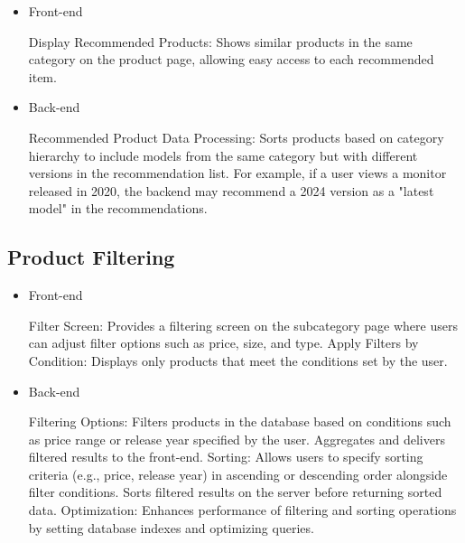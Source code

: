 \documentclass[conference]{IEEEtran}
\begin{document}
\begin{itemize}
\setlength{\parindent}{2ex}
\item Front-end

Display Recommended Products: Shows similar products in the same category on the product page, allowing easy access to each recommended item.

\item Back-end

Recommended Product Data Processing: Sorts products based on category hierarchy to include models from the same category but with different versions in the recommendation list. For example, if a user views a monitor released in 2020, the backend may recommend a 2024 version as a "latest model" in the recommendations.

\end{itemize}

\subsection{Product Filtering}

\begin{itemize}
\setlength{\parindent}{2ex}
\item Front-end

Filter Screen: Provides a filtering screen on the subcategory page where users can adjust filter options such as price, size, and type. \newline\hspace*{1.2ex}
Apply Filters by Condition: Displays only products that meet the conditions set by the user.

\item Back-end

Filtering Options: Filters products in the database based on conditions such as price range or release year specified by the user. Aggregates and delivers filtered results to the front-end. \newline\hspace*{1.2ex}
Sorting: Allows users to specify sorting criteria (e.g., price, release year) in ascending or descending order alongside filter conditions. Sorts filtered results on the server before returning sorted data.\newline\hspace*{1.2ex}
Optimization: Enhances performance of filtering and sorting operations by setting database indexes and optimizing queries.

\end{itemize}
\end{document}
